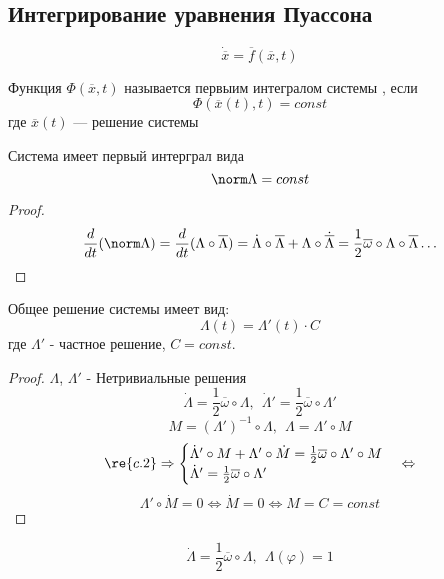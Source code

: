   \subsection{Интегрирование уравнения Пуассона}
  \begin{equation} 
  \label{upper_system}
  \dot{\overline x} = \overline f(\overline x, t)
  \end{equation}
  \begin{df}
  Функция $\Phi(\overline x, t)$ называется первыим интегралом системы , если
  \[ \Phi(\overline x(t), t) = const \]
  где $\overline x(t)$ --- решение системы 
  \end{df}
  \begin{ass}
  Система  имеет первый интерграл вида
  \[\norm \Lambda = const \]
  \end{ass}
  \begin{proof}
  \[ \frac{d}{dt}(\norm \Lambda) = \frac{d}{dt}(\Lambda \circ \overline \Lambda) = \dot \Lambda \circ \overline \Lambda + \Lambda \circ \dot{\overline \Lambda} = \frac{1}{2} \overline \omega \circ \Lambda \circ \overline \Lambda \ldots \]
  \end{proof}
  \begin{ass}
  Общее решение системы  имеет вид:
  \[ \Lambda(t) = \Lambda'(t) \cdot C\]
  где $\Lambda'$ - частное решение, $C = const$.
  \end{ass}
  \begin{proof}
  $\Lambda$, $\Lambda'$ - Нетривиальные решения 
  \[ \dot \Lambda = \frac{1}{2}\overline \omega \circ \Lambda,~~ \dot{\Lambda}' = \frac{1}{2}\overline \omega \circ \Lambda'\]
  \[ M = (\Lambda')^{-1} \circ \Lambda,~~ \Lambda = \Lambda' \circ M \]
  \[ \re{c.2} \Rightarrow \begin{cases}
  \dot \Lambda' \circ M + \Lambda' \circ \dot M = \frac{1}{2} \overline \omega \circ \Lambda' \circ M \\
  \dot \Lambda' = \frac{1}{2}\overline \omega \circ \Lambda'
  \end{cases}  \Leftrightarrow \]
  \[ \Lambda' \circ \dot M = 0 \Leftrightarrow \dot M = 0 \Leftrightarrow M = C = const \]
  \end{proof}
  \begin{cor}
  \begin{equation}
  \label{c.3} 
  \dot \Lambda = \frac{1}{2} \overline \omega \circ \Lambda,~~ \Lambda(\varphi) = 1 
  \end{equation}
  \end{cor}

